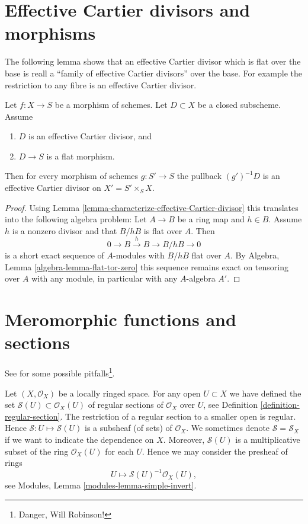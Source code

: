 \section{Effective Cartier divisors and morphisms}
\label{section-effective-Cartier-morphisms}

\noindent
The following lemma shows that an effective Cartier divisor which is
flat over the base is reall a ``family of effective Cartier divisors''
over the base. For example the restriction to any fibre is an effective
Cartier divisor.

\begin{lemma}
\label{lemma-relative-Cartier}
Let $f : X \to S$ be a morphism of schemes.
Let $D \subset X$ be a closed subscheme.
Assume
\begin{enumerate}
\item $D$ is an effective Cartier divisor, and
\item $D \to S$ is a flat morphism.
\end{enumerate}
Then for every morphism of schemes $g : S' \to S$ the pullback
$(g')^{-1}D$ is an effective Cartier divisor on $X' = S' \times_S X$.
\end{lemma}

\begin{proof}
Using
Lemma \ref{lemma-characterize-effective-Cartier-divisor}
this translates into the following algebra problem: Let $A \to B$ be a ring
map and $h \in B$. Assume $h$ is a nonzero divisor and that $B/hB$ is flat
over $A$. Then
$$
0 \to B \xrightarrow{h} B \to B/hB \to 0
$$
is a short exact sequence of $A$-modules with $B/hB$ flat over $A$. By
Algebra, Lemma \ref{algebra-lemma-flat-tor-zero}
this sequence remains exact on tensoring over $A$ with any module, in
particular with any $A$-algebra $A'$.
\end{proof}






\section{Meromorphic functions and sections}
\label{section-meromorphic-functions}

\noindent
See \cite{misconceptions} for some possible
pitfalls\footnote{Danger, Will Robinson!}.

\medskip\noindent
Let $(X, \mathcal{O}_X)$ be a locally ringed space.
For any open $U \subset X$ we have defined the set
$\mathcal{S}(U) \subset \mathcal{O}_X(U)$
of regular sections of $\mathcal{O}_X$ over $U$, see
Definition \ref{definition-regular-section}. The restriction
of a regular section to a smaller open is regular. Hence
$\mathcal{S} : U \mapsto \mathcal{S}(U)$ is a subsheaf (of sets)
of $\mathcal{O}_X$. We sometimes denote $\mathcal{S} = \mathcal{S}_X$
if we want to indicate the dependence on $X$.
Moreover, $\mathcal{S}(U)$
is a multiplicative subset of the ring $\mathcal{O}_X(U)$ for
each $U$. Hence we may consider
the presheaf of rings
$$
U \longmapsto \mathcal{S}(U)^{-1} \mathcal{O}_X(U),
$$
see Modules, Lemma \ref{modules-lemma-simple-invert}.

